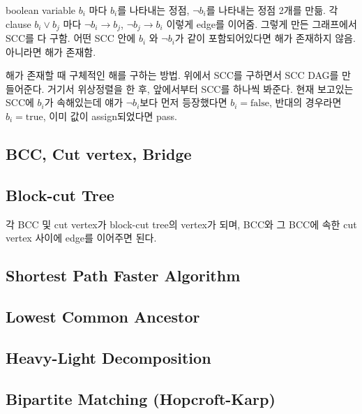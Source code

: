 \documentclass[10pt,landscape,a4paper,twocolumn]{article}
\begin{document}
boolean variable $b_{i}$ 마다 $b_{i}$를 나타내는 정점, $\neg b_{i} $를 나타내는 정점 2개를 만듦. 각 clause $b_{i} \lor b_{j}$ 마다 $\neg b_{i} \to b_{j}$, $\neg b_{j} \to b_{i}$ 이렇게 edge를 이어줌. 그렇게 만든 그래프에서 SCC를 다 구함. 어떤 SCC 안에 $b_{i}$ 와 $\neg b_{i}$가 같이 포함되어있다면 해가 존재하지 않음. 아니라면 해가 존재함.

해가 존재할 때 구체적인 해를 구하는 방법. 위에서 SCC를 구하면서 SCC DAG를 만들어준다. 거기서 위상정렬을 한 후, 앞에서부터 SCC를 하나씩 봐준다. 현재 보고있는 SCC에 $b_{i}$가 속해있는데 얘가 $\neg b_{i}$보다 먼저 등장했다면 $b_{i} = \mathrm{false}$, 반대의 경우라면 $b_{i} = \mathrm{true}$, 이미 값이 assign되었다면 pass.

\subsection{BCC, Cut vertex, Bridge}


\subsection{Block-cut Tree}

각 BCC 및 cut vertex가 block-cut tree의 vertex가 되며, BCC와 그 BCC에 속한 cut vertex 사이에 edge를 이어주면 된다.

\subsection{Shortest Path Faster Algorithm}


\subsection{Lowest Common Ancestor}


\subsection{Heavy-Light Decomposition}


\subsection{Bipartite Matching (Hopcroft-Karp)}

\end{document}
